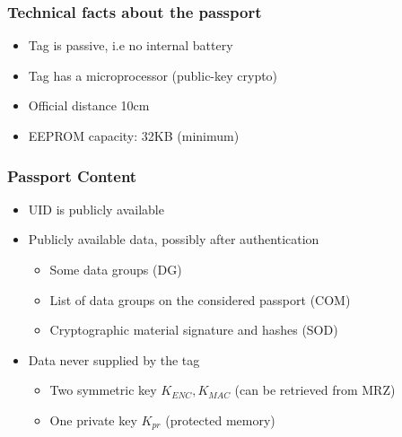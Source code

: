 \subsubsection{Technical facts about the passport}
\begin{itemize}
    \item Tag is passive, i.e no internal battery
    \item Tag has a microprocessor (public-key crypto)
    \item Official distance 10cm
    \item EEPROM capacity: 32KB (minimum)
\end{itemize}

\subsubsection{Passport Content}
\begin{itemize}
    \item UID is publicly available
    \item Publicly available data, possibly after authentication
    \begin{itemize}
        \item Some data groups (DG)
        \item List of data groups on the considered passport (COM)
        \item Cryptographic material signature and hashes (SOD)
    \end{itemize}
    \item Data never supplied by the tag
    \begin{itemize}
        \item Two symmetric key $K_{ENC},K_{MAC}$ (can be retrieved from MRZ)
        \item One private key $K_{pr}$ (protected memory)
    \end{itemize}
\end{itemize}


